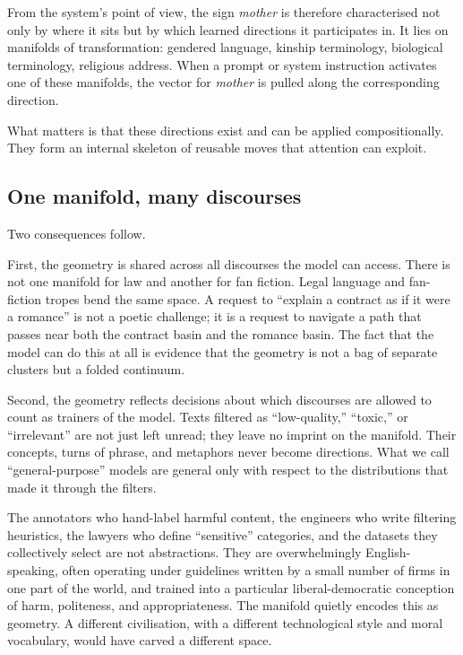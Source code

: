From the system's point of view, the sign \emph{mother} is therefore characterised not only by where it sits but by which learned directions it participates in. It lies on manifolds of transformation: gendered language, kinship terminology, biological terminology, religious address. When a prompt or system instruction activates one of these manifolds, the vector for \emph{mother} is pulled along the corresponding direction.

What matters is that these directions exist and can be applied compositionally. They form an internal skeleton of reusable moves that attention can exploit.

\subsection*{One manifold, many discourses}

Two consequences follow.

First, the geometry is shared across all discourses the model can access. There is not one manifold for law and another for fan fiction. Legal language and fan-fiction tropes bend the same space. A request to ``explain a contract as if it were a romance'' is not a poetic challenge; it is a request to navigate a path that passes near both the contract basin and the romance basin. The fact that the model can do this at all is evidence that the geometry is not a bag of separate clusters but a folded continuum.

Second, the geometry reflects decisions about which discourses are allowed to count as trainers of the model. Texts filtered as ``low-quality,'' ``toxic,'' or ``irrelevant'' are not just left unread; they leave no imprint on the manifold. Their concepts, turns of phrase, and metaphors never become directions. What we call ``general-purpose'' models are general only with respect to the distributions that made it through the filters.

The annotators who hand-label harmful content, the engineers who write filtering heuristics, the lawyers who define ``sensitive'' categories, and the datasets they collectively select are not abstractions. They are overwhelmingly English-speaking, often operating under guidelines written by a small number of firms in one part of the world, and trained into a particular liberal-democratic conception of harm, politeness, and appropriateness. The manifold quietly encodes this as geometry. A different civilisation, with a different technological style and moral vocabulary, would have carved a different space.

